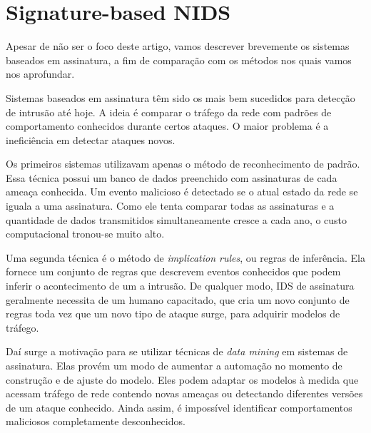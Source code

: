 \chapter{Signature-based NIDS}
\label{ch:snids}
Apesar de não ser o foco deste artigo, vamos descrever brevemente os sistemas baseados em assinatura, a fim de
comparação com os métodos nos quais vamos nos aprofundar.
\par Sistemas baseados em assinatura têm sido os mais bem sucedidos para detecção de intrusão até hoje.
A ideia é comparar o tráfego da rede com padrões de comportamento conhecidos durante certos ataques.
O maior problema é a ineficiência em detectar ataques novos.
\par Os primeiros sistemas utilizavam apenas o método de reconhecimento de padrão. Essa técnica possui um banco de dados
 preenchido com assinaturas de cada ameaça conhecida. Um evento malicioso é detectado se o atual estado da rede se iguala
 a uma assinatura. Como ele tenta comparar todas as assinaturas e a quantidade de dados transmitidos simultaneamente
cresce a cada ano, o custo computacional tronou-se muito alto.
\par Uma segunda técnica é o método de \textit{implication rules}, ou regras de inferência. Ela fornece um conjunto de
regras que descrevem eventos conhecidos que podem inferir o acontecimento de um a intrusão. De qualquer modo, IDS de
assinatura geralmente necessita de um humano capacitado, que cria um novo conjunto de regras toda vez que um novo
tipo de ataque surge, para adquirir modelos de tráfego.
\par Daí surge a motivação para se utilizar técnicas de \textit{data mining} em sistemas de assinatura. Elas provém um
 modo de aumentar a automação no momento de construção e de ajuste do modelo. Eles podem adaptar os modelos à medida que
 acessam tráfego de rede contendo novas ameaças ou detectando diferentes versões de um ataque conhecido. Ainda assim,
 é impossível identificar comportamentos maliciosos completamente desconhecidos.
